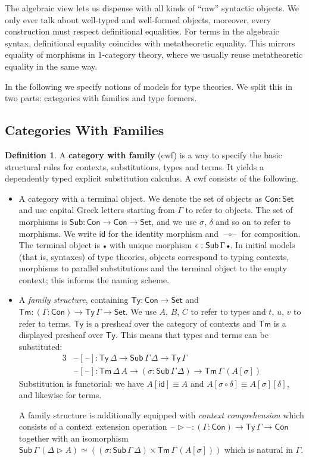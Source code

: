 \documentclass[12pt,a4paper,twoside,openany]{book}
\theoremstyle{remark}
\theoremstyle{definition}
\newtheorem{mydefinition}{Definition}
\theoremstyle{theorem}
\newcommand{\id}{\mathsf{id}}
\newcommand{\Con}{\mathsf{Con}}
\newcommand{\Sub}{\mathsf{Sub}}
\newcommand{\Tm}{\mathsf{Tm}}
\newcommand{\Ty}{\mathsf{Ty}}
\newcommand{\blank}{\mathord{\hspace{1pt}\text{--}\hspace{1pt}}}
\newcommand{\Set}{\mathsf{Set}}
\newcommand{\ext}{\triangleright}
\newcommand{\emptycon}{\scaleobj{.75}\bullet}
\begin{document}
The algebraic view lets us dispense with all kinds of ``raw'' syntactic objects.
We only ever talk about well-typed and well-formed objects, moreover, every
construction must respect definitional equalities. For terms in the algebraic
syntax, definitional equality coincides with metatheoretic equality. This
mirrors equality of morphisms in 1-category theory, where we usually reuse
metatheoretic equality in the same way.

In the following we specify notions of models for type theories. We split this
in two parts: categories with families and type formers.

\subsection{Categories With Families}

\begin{mydefinition}
A \textbf{category with family} (cwf) \cite{Dybjer96internaltype} is a way to
specify the basic structural rules for contexts, substitutions, types and
terms. It yields a dependently typed explicit substitution calculus.  A cwf
consists of the following.
\begin{itemize}
\item
  A category with a terminal object. We denote the set of objects as $\Con :
  \Set$ and use capital Greek letters starting from $\Gamma$ to refer to
  objects. The set of morphisms is $\Sub : \Con \to \Con \to \Set$, and we use
  $\sigma$, $\delta$ and so on to refer to morphisms. We write $\id$ for the
  identity morphism and $\blank\circ\blank$ for composition. The terminal
  object is $\emptycon$ with unique morphism $\epsilon :
  \Sub\,\Gamma\,\emptycon$. In initial models (that is, syntaxes) of type
  theories, objects correspond to typing contexts, morphisms to parallel
  substitutions and the terminal object to the empty context; this informs the
  naming scheme.
\item A \emph{family structure}, containing $\Ty : \Con \to \Set$ and $\Tm :
  (\Gamma : \Con) \to \Ty\,\Gamma \to \Set$. We use $A$, $B$, $C$ to refer to
  types and $t$, $u$, $v$ to refer to terms. $\Ty$ is a presheaf over the
  category of contexts and $\Tm$ is a displayed presheaf over $\Ty$. This means
  that types and terms can be substituted:
  \begin{alignat*}{3}
    &\blank[\blank] : \Ty\,\Delta \to \Sub\,\Gamma\,\Delta \to \Ty\,\Gamma\\
    &\blank[\blank] : \Tm\,\Delta\,A \to (\sigma : \Sub\,\Gamma\,\Delta) \to \Tm\,\Gamma\,(A[\sigma])
  \end{alignat*}
  Substitution is functorial: we have $A[\id] \equiv A$ and
  $A[\sigma\circ\delta] \equiv A[\sigma][\delta]$, and likewise for terms.

  A family structure is additionally equipped with \emph{context comprehension}
  which consists of a context extension operation $\blank\ext\blank : (\Gamma :
  \Con) \to \Ty\,\Gamma \to \Con$ together with an isomorphism
  $\Sub\,\Gamma\,(\Delta\ext A) \simeq ((\sigma : \Sub\,\Gamma\,\Delta) \times
  \Tm\,\Gamma\,(A[\sigma]))$ which is natural in $\Gamma$.
\end{itemize}
\end{mydefinition}
\end{document}
